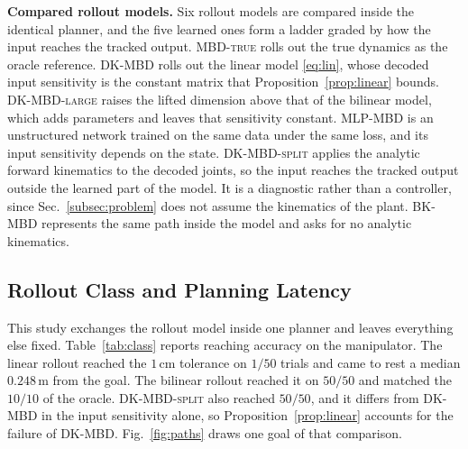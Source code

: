 \documentclass[letterpaper,10pt,conference]{ieeeconf}
\newcommand{\mbdtrue}{\textsc{MBD-true}}
\newcommand{\dkmbd}{\textsc{DK-MBD}}
\newcommand{\dksplit}{\textsc{DK-MBD-split}}
\newcommand{\bkmbd}{\textsc{BK-MBD}}
\newcommand{\dklarge}{\textsc{DK-MBD-large}}
\newcommand{\mlpmbd}{\textsc{MLP-MBD}}
\begin{document}
\textbf{Compared rollout models.}
Six rollout models are compared inside the identical planner, and the five learned ones form a ladder graded by how the input reaches the tracked output.
\mbdtrue{} rolls out the true dynamics as the oracle reference.
\dkmbd{} rolls out the linear model \eqref{eq:lin}, whose decoded input sensitivity is the constant matrix that Proposition~\ref{prop:linear} bounds.
\dklarge{} raises the lifted dimension above that of the bilinear model, which adds parameters and leaves that sensitivity constant.
\mlpmbd{} is an unstructured network trained on the same data under the same loss, and its input sensitivity depends on the state.
\dksplit{} applies the analytic forward kinematics to the decoded joints, so the input reaches the tracked output outside the learned part of the model.
It is a diagnostic rather than a controller, since Sec.~\ref{subsec:problem} does not assume the kinematics of the plant.
\bkmbd{} represents the same path inside the model and asks for no analytic kinematics.

\subsection{Rollout Class and Planning Latency}\label{subsec:exp_class}

This study exchanges the rollout model inside one planner and leaves everything else fixed.
Table~\ref{tab:class} reports reaching accuracy on the manipulator.
The linear rollout reached the $1$\,cm tolerance on $1/50$ trials and came to rest a median $0.248$\,m from the goal.
The bilinear rollout reached it on $50/50$ and matched the $10/10$ of the oracle.
\dksplit{} also reached $50/50$, and it differs from \dkmbd{} in the input sensitivity alone, so Proposition~\ref{prop:linear} accounts for the failure of \dkmbd{}.
Fig.~\ref{fig:paths} draws one goal of that comparison.
\end{document}

